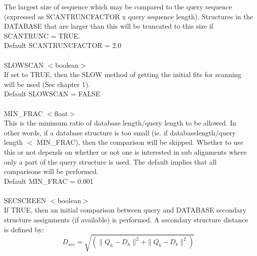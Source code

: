 The largest size of sequence which may be compared to the query 
sequence (expressed as SCANTRUNCFACTOR x query sequence length). 
Structures in the DATABASE that are larger than this will be
truncated  to this size if SCANTRUNC = TRUE.\\
Default SCANTRUNCFACTOR = 2.0\\
\\
SLOWSCAN $<$boolean$>$\\
If set to TRUE, then the SLOW method of getting the initial fits
for scanning will be used (See chapter 1).\\
Default SLOWSCAN = FALSE\\
\\
MIN\_FRAC $<$float$>$\\
This is the minimum ratio of database length/query length to be 
allowed.  In other words, if a database structure is too small 
(ie. if databaselength/query length $<$ MIN\_FRAC), then the
comparison will be skipped.  Whether to use this or not depends on
whether or not one is interested in sub alignments where only a
part of the query structure is used.  The default implies that all
comparisons will be performed.\\
Default MIN\_FRAC = 0.001\\
\\
SECSCREEN $<$boolean$>$\\
If TRUE, then an initial comparison between query and DATABASE
secondary structure assignments (if available) is performed.  A
secondary structure distance is defined by:\\

\[
D_{sec} = \sqrt{(\|Q_{h} - D_{h}\|^{2} + \|Q_{b} - D_{b}\|^{2})}
\]

